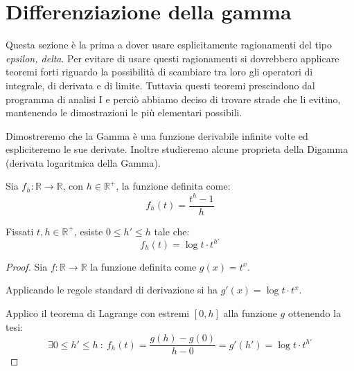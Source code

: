 \section{Differenziazione della gamma}\label{dg}
Questa sezione è la prima a dover usare esplicitamente ragionamenti del tipo \emph{epsilon, delta}.
Per evitare di usare questi ragionamenti si dovrebbero applicare teoremi forti riguardo la possibilità
di scambiare tra loro gli operatori di integrale, di derivata e di limite.
Tuttavia questi teoremi prescindono dal programma di analisi I e perciò abbiamo deciso di trovare strade
che li evitino, mantenendo le dimostrazioni le più elementari possibili.

Dimostreremo che la Gamma è una funzione derivabile infinite volte ed espliciteremo le sue derivate.
Inoltre studieremo alcune proprieta della Digamma (derivata logaritmica della Gamma).

\begin{definition}
	Sia $f_h:\mathbb{R}\to\mathbb{R}$, con $h\in\mathbb{R^+}$, la funzione definita come:
	\begin{equation*}
		f_h(t)=\frac{t^h-1}h
	\end{equation*}

\end{definition}

\begin{lemma}\label{dg:LagrangeApprox}
	Fissati $t,h\in\mathbb{R^+}$, esiste $0\le h'\le h$ tale che:
	\begin{equation*}
		f_h(t)=\log{t}\cdot t^{h'}
	\end{equation*}
\end{lemma}
\begin{proof}
	Sia $f:\mathbb{R}\to\mathbb{R}$ la funzione definita come $g(x)=t^x$.
	
	Applicando le regole standard di derivazione si ha $g'(x)=\log{t}\cdot t^x$.
	
	Applico il teorema di Lagrange con estremi $[0,h]$ alla funzione $g$ ottenendo la tesi:
	\begin{equation*}
		\exists 0\le h'\le h\ :\ f_h(t)=\frac{g(h)-g(0)}{h-0}=g'(h')=\log{t}\cdot t^{h'}
	\end{equation*}
\end{proof}



